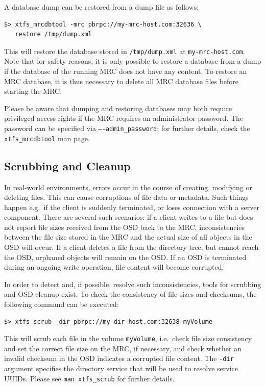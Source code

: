 \documentclass[a4paper,10pt]{book}
\begin{document}
A database dump can be restored from a dump file as follows:

\begin{verbatim}
$> xtfs_mrcdbtool -mrc pbrpc://my-mrc-host.com:32636 \
   restore /tmp/dump.xml
\end{verbatim}

This will restore the database stored in \texttt{/tmp/dump.xml} at \texttt{my-mrc-host.com}. Note that for safety reasons, it is only possible to restore a database from a dump if the database of the running MRC does not have any content. To restore an MRC database, it is thus necessary to delete all MRC database files before starting the MRC.

Please be aware that dumping and restoring databases may both require privileged access rights if the MRC requires an administrator password. The password can be specified via \texttt{----admin\_password}; for further details, check the \texttt{xtfs\_mrcdbtool} man page.

\subsection{Scrubbing and Cleanup}
\label{sec:scrubber_cleanup}

In real-world environments, errors occur in the course of creating, modifying or deleting files. This can cause corruptions of file data or metadata. Such things happen e.g.\ if the client is suddenly terminated, or loses connection with a server component. There are several such scenarios: if a client writes to a file but does not report file sizes received from the OSD back to the MRC, inconsistencies between the file size stored in the MRC and the actual size of all objects in the OSD will occur. If a client deletes a file from the directory tree, but cannot reach the OSD, orphaned objects will remain on the OSD. If an OSD is terminated during an ongoing write operation, file content will become corrupted.

In order to detect and, if possible, resolve such inconsistencies, tools for scrubbing and OSD cleanup exist. To check the consistency of file sizes and checksums, the following command can be executed:

\begin{verbatim}
$> xtfs_scrub -dir pbrpc://my-dir-host.com:32638 myVolume
\end{verbatim}

This will scrub each file in the volume \texttt{myVolume}, i.e.\ check file size consistency and set the correct file size on the MRC, if necessary, and check whether an invalid checksum in the OSD indicates a corrupted file content. The \texttt{-dir} argument specifies the directory service that will be used to resolve service UUIDs. Please see \texttt{man xtfs\_scrub} for further details.
\end{document}
